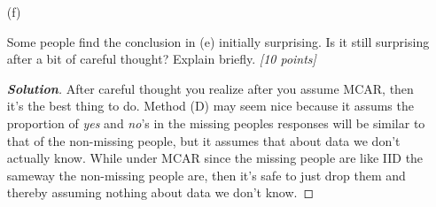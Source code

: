 \documentclass[12pt]{article}
\newenvironment{solution}{\begin{proof}[\textbf{\textit{Solution}}] }{\end{proof}}
\begin{document}
\begin{itemize}
\newpage
\begin{itemize}

\item[(f)]

Some people find the conclusion in (e) initially surprising. Is it still surprising after a bit of careful thought? Explain briefly. \textit{[10 points]}
\begin{tcolorbox}
    \begin{solution}
        After careful thought you realize after you assume MCAR, then it's the best thing to do. Method (D) may seem nice because it assums the proportion of \textit{yes} and \textit{no}'s in the missing peoples responses will be similar to that of the non-missing people, but it assumes that about data we don't actually know. While under MCAR since the missing people are like IID the sameway the non-missing people are, then it's safe to just drop them and thereby assuming nothing about data we don't know. 
    \end{solution}
\end{tcolorbox}

\vspace*{1.0in}

\end{itemize}

\end{itemize}
\end{document}
